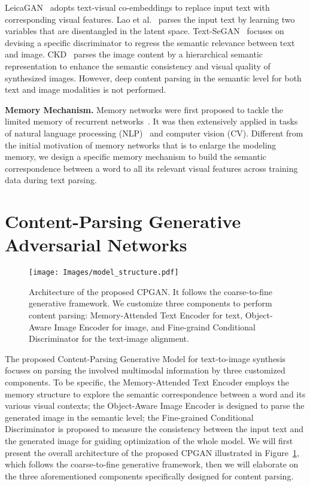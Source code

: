 \documentclass[runningheads]{llncs}
\begin{document}
LeicaGAN~\cite{qiao2019learn} adopts text-visual co-embeddings to replace input text with corresponding visual features.
Lao et al.~\cite{lao2019dual} parses the input text by learning two variables that are
disentangled in the latent space.
Text-SeGAN~\cite{cha2019adversarial} focuses on devising a specific discriminator to regress the semantic relevance between text and image. CKD~\cite{yuan2019ckd} parses the image content by a hierarchical semantic representation to enhance the semantic consistency and visual quality of synthesized images. 
However, deep content parsing in the semantic level for both text and image modalities is not performed. 

\smallskip\noindent\textbf{Memory Mechanism.}
Memory networks were first proposed to tackle the limited memory of recurrent networks~\cite{Weston2015,sukhbaatar2015end-to-end}. It was then extensively applied in tasks of natural language processing (NLP)~\cite{das2017question,feng2017memory-augmented,maruf2017document,wang2018target-sensitive} and computer vision (CV)\cite{ma2017visual,mohtarami2018automatic,pei2019memory}. Different from the initial motivation of memory networks that is to enlarge the modeling memory, we design a specific memory mechanism to build the semantic correspondence between a word to all its relevant visual features across training data during text parsing.  
\section{Content-Parsing Generative Adversarial Networks}
\begin{figure}[t]
\centering
\texttt{[image: Images/model\_structure.pdf]}
\caption{Architecture of the proposed CPGAN. It follows the coarse-to-fine generative framework. We customize three components to perform content parsing: Memory-Attended Text Encoder for text, Object-Aware Image Encoder for image, and Fine-graind Conditional Discriminator for the text-image alignment.}
\label{fig:model}
\end{figure}

The proposed Content-Parsing Generative Model for text-to-image synthesis focuses on parsing the involved multimodal information by three customized components. To be specific, the Memory-Attended Text Encoder employs the memory structure to explore the semantic correspondence between a word and its various visual contexts; the Object-Aware Image Encoder is designed to parse the generated image in the semantic level; the Fine-grained Conditional Discriminator is proposed to measure the consistency between the input text and the generated image for guiding optimization of the whole model. 
We will first present the overall architecture of the proposed CPGAN illustrated in Figure~\ref{fig:model}, which follows the coarse-to-fine generative framework, then we will elaborate on the three aforementioned components specifically designed for content parsing. 
\end{document}
